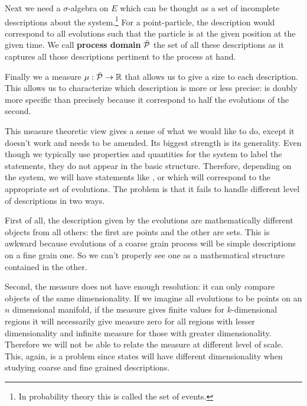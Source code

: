 \documentclass[letterpaper]{article}
\begin{document}
Next we need a $\sigma$-algebra on $E$ which can be thought as a set of incomplete descriptions about the system.\footnote{In probability theory this is called the set of events.} For a point-particle, the description  would correspond to all evolutions such that the particle is at the given position at the given time. We call \textbf{process domain} $\tdomain[P]$ the set of all these descriptions as it captures all those descriptions pertinent to the process at hand.

Finally we a measure $\mu : \tdomain[P] \to \mathbb{R}$ that allows us to give a size to each description. This allows us to characterize which description is more or less precise:  is doubly more specific than  precisely because it correspond to half the evolutions of the second.

This measure theoretic view gives a sense of what we would like to do, except it doesn't work and needs to be amended. Its biggest strength is its generality. Even though we typically use properties and quantities for the system to label the statements, they do not appear in the basic structure. Therefore, depending on the system, we will have statements like ,  or  which will correspond to the appropriate set of evolutions. The problem is that it fails to handle different level of descriptions in two ways.

First of all, the description given by the evolutions are mathematically different objects from all others: the first are points and the other are sets. This is awkward because evolutions of a coarse grain process will be simple descriptions on a fine grain one. So we can't properly see one as a mathematical structure contained in the other.

Second, the measure does not have enough resolution: it can only compare objects of the same dimensionality. If we imagine all evolutions to be points on an $n$ dimensional manifold, if the measure gives finite values for $k$-dimensional regions it will necessarily give measure zero for all regions with lesser dimensionality and infinite measure for those with greater dimensionality. Therefore we will not be able to relate the measure at different level of scale. This, again, is a problem since states will have different dimensionality when studying coarse and fine grained descriptions.
\end{document}
